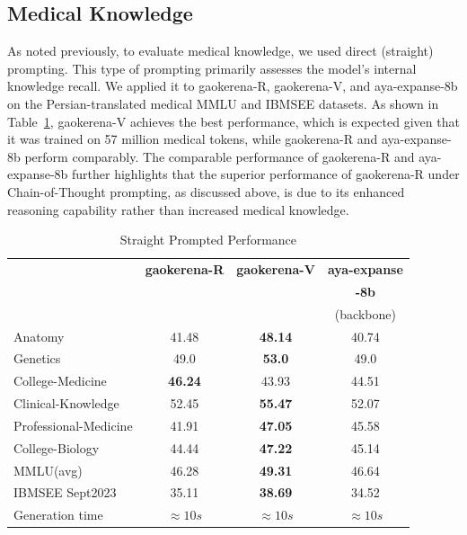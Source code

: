\documentclass[conference]{IEEEtran}
\begin{document}
           \subsection{Medical Knowledge}
As noted previously, to evaluate medical knowledge, we used direct (straight) prompting. This type of prompting primarily assesses the model's internal knowledge recall. We applied it to gaokerena-R, gaokerena-V, and aya-expanse-8b on the Persian-translated medical MMLU and IBMSEE datasets. As shown in Table~\ref{tab:med_knowledge_comparison}, gaokerena-V achieves the best performance, which is expected given that it was trained on 57 million medical tokens, while gaokerena-R and aya-expanse-8b perform comparably. The comparable performance of gaokerena-R and aya-expanse-8b further highlights that the superior performance of gaokerena-R under Chain-of-Thought prompting, as discussed above, is due to its enhanced reasoning capability rather than increased medical knowledge.

 

	\begin{table}[ht]
		\centering
		\caption{Straight Prompted Performance}
		\begin{tabular}{|l|c|c|c|}  
			\hline
			\textbf{} & \textbf{gaokerena-R} & \textbf{gaokerena-V} & \textbf{aya-expanse} \\ 
			& &  & \textbf{-8b} \\
			&   & &(backbone)  \\ \hline
			Anatomy  & 41.48 & \textbf{48.14}  & 40.74  \\ \hline
			Genetics & 49.0  & \textbf{53.0}  &  49.0 \\ \hline
			College-Medicine & \textbf{46.24} & 43.93  & 44.51   \\ \hline
			Clinical-Knowledge & 52.45 & \textbf{55.47}  & 52.07  \\ \hline
			Professional-Medicine& 41.91  & \textbf{47.05}  & 45.58   \\ \hline
			College-Biology& 44.44 & \textbf{47.22}  &  45.14 \\ \hline
			MMLU(avg) & 46.28 & \textbf{49.31}  & 46.64 \\ \hline
			IBMSEE Sept2023 & 35.11  &\textbf{38.69} & 34.52  \\ \hline
			Generation time & $\approx10s$ & $\approx 10s$ & $\approx 10s$ \\  \hline
		\end{tabular}
		\label{tab:med_knowledge_comparison}
	\end{table}
\end{document}
